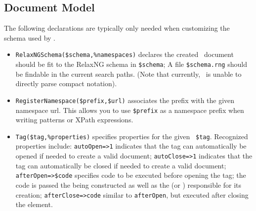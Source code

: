 \documentclass{book}
\begin{document}
\subsection{Document Model}\label{customization.latexml.schema}
The following declarations are typically only needed when customizing
the schema used by \LaTeXML.
\begin{itemize}
\item \verb|RelaxNGSchema($schema,%namespaces)| declares the created
 \XML\ document should be fit to the RelaxNG schema in \verb|$schema|;
 A file \verb|$schema.rng| should be findable in the current search paths.
(Note that currently, \LaTeXML\ is unable to directly parse compact notation).
\item \verb|RegisterNamespace($prefix,$url)| associates the
 prefix with the given namespace url.  This allows you to use \verb|$prefix|
 as a namespace prefix when writing  patterns or XPath expressions.
\item \verb|Tag($tag,%properties)| specifies properties for the given \XML\ \verb|$tag|.
Recognized properties include:
\verb|autoOpen=>1| indicates that the tag
can automatically be opened if needed to create a valid document;
\verb|autoClose=>1| indicates that the tag can automatically be closed if needed to create
a valid document;
\verb|afterOpen=>$code| specifies code to be executed before opening the tag;
the code is passed the  being constructed as well as the
 (or ) responsible for its creation;
\verb|afterClose=>code| similar to \texttt{afterOpen}, but executed after closing
the element.
\end{itemize}
\end{document}
